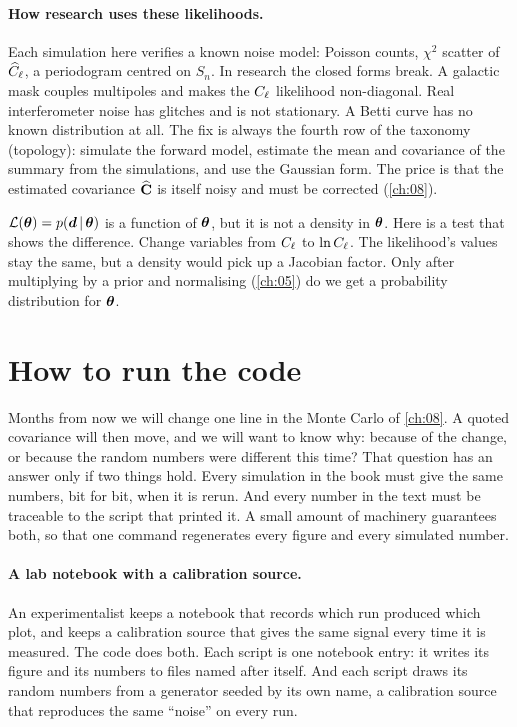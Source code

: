 \paragraph{How research uses these likelihoods.}
Each simulation here verifies a known noise model: Poisson counts, $\chi^2$
scatter of $\widehat{C}_\ell$, a periodogram centred on $S_n$. In research the closed
forms break. A galactic mask couples multipoles and makes the $C_\ell$
likelihood non-diagonal. Real interferometer noise has glitches and is not
stationary. A Betti curve has no known distribution at all. The fix is always
the fourth row of the taxonomy (topology): simulate the forward model,
estimate the mean and covariance of the summary from the simulations, and use
the Gaussian form. The price is that the estimated covariance
$\widehat{\mathbf{C}}$ is itself noisy and must be corrected \cite{Hartlap2007}
(\cref{ch:08}).

\begin{pitfall}
$\mathcal{L}(\bm{\theta})=p(\bm{d}\,\vert\,\bm{\theta})$ is a function of $\bm{\theta}$, but it is
not a density in $\bm{\theta}$. Here is a test that shows the difference. Change
variables from $C_\ell$ to $\ln C_\ell$. The likelihood's values stay the same,
but a density would pick up a Jacobian factor. Only after multiplying by a
prior and normalising (\cref{ch:05}) do we get a probability distribution for
$\bm{\theta}$.
\end{pitfall}

\section{How to run the code}\label{0a:sec:code}

Months from now we will change one line in the Monte Carlo of \cref{ch:08}.
A quoted covariance will then move, and we will want to know why: because of
the change, or because the random numbers were different this time? That
question has an answer only if two things hold. Every simulation in the book
must give the same numbers, bit for bit, when it is rerun. And every number in
the text must be traceable to the script that printed it. A small amount of
machinery guarantees both, so that one command regenerates every figure and
every simulated number.

\paragraph{A lab notebook with a calibration source.}
An experimentalist keeps a notebook that records which run produced which plot,
and keeps a calibration source that gives the same signal every time it is
measured. The code does both. Each script is one notebook entry: it writes its
figure and its numbers to files named after itself. And each script draws its
random numbers from a generator seeded by its own name, a calibration source
that reproduces the same ``noise'' on every run.

